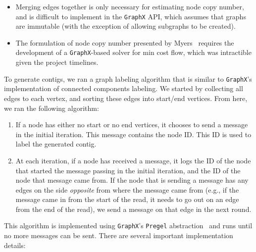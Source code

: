 \documentclass[11pt]{article}
\theoremstyle{plain}
\begin{document}
\begin{itemize}
\item Merging edges together is only necessary for estimating node copy number, and is difficult
to implement in the \texttt{GraphX} API, which assumes that graphs are immutable (with the
exception of allowing subgraphs to be created).
\item The formulation of node copy number presented by Myers~\cite{myers05} requires the
development of a \texttt{GraphX}-based solver for min cost flow, which was intractible given the
project timelines.
\end{itemize}

To generate contigs, we ran a graph labeling algorithm that is similar to \texttt{GraphX}'s
implementation of connected components labeling. We started by collecting all edges to each
vertex, and sorting these edges into start/end vertices. From here, we ran the following
algorithm:

\begin{enumerate}
\item If a node has either no start or no end vertices, it chooses to send a message in
the initial iteration. This message contains the node ID. This ID is used to label the
generated contig.
\item At each iteration, if a node has received a message, it logs the ID of the node
that started the message passing in the initial iteration, and the ID of the node that
message came from. If the node that is sending a message has any edges on the side
\emph{opposite} from where the message came from (e.g., if the message came in from the
start of the read, it needs to go out on an edge from the end of the read), we send a
message on that edge in the next round.
\end{enumerate}

This algorithm is implemented using \texttt{GraphX}'s \texttt{Pregel} abstraction~\cite{malewicz10}
and runs until no more messages can be sent. There are several important implementation
details:
\end{document}
